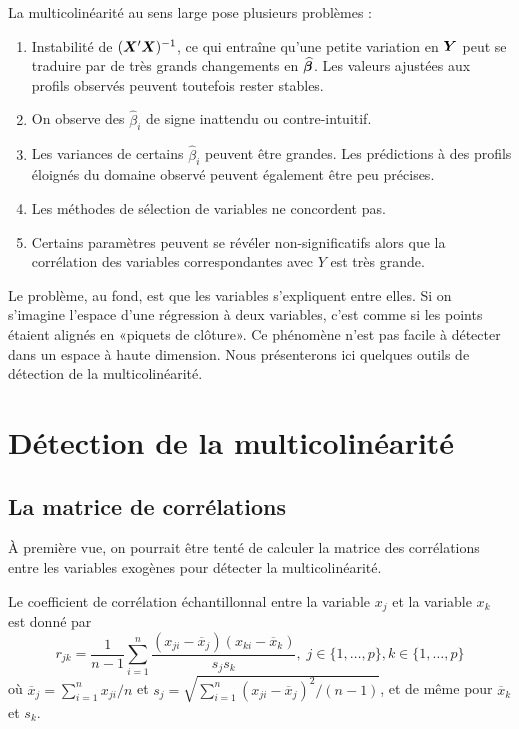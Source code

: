 La multicolinéarité au sens large pose plusieurs problèmes :
\begin{enumerate}
  \item Instabilité de $(\bm{X}'\bm{X})^{-1}$, ce qui entraîne qu'une petite variation en $\bm{Y}$ peut se traduire par de très grands changements en $\widehat{\bm\beta}$. Les valeurs ajustées aux profils observés peuvent toutefois rester stables.
  \item On observe des $\hat{\beta}_i$ de signe inattendu ou contre-intuitif.
  \item Les variances de certains $\hat{\beta}_i$ peuvent être grandes. Les prédictions à des profils éloignés du domaine observé peuvent également être peu précises.
  \item Les méthodes de sélection de variables ne concordent pas.
  \item Certains paramètres peuvent se révéler non-significatifs alors que la corrélation des variables correspondantes avec $Y$ est très grande.
\end{enumerate}

Le problème, au fond, est que les variables s'expliquent entre elles. Si on s'imagine l'espace d'une régression à deux variables, c'est comme si les points étaient alignés en «piquets de clôture». Ce phénomène n'est pas facile à détecter dans un espace à haute dimension. Nous présenterons ici quelques outils de détection de la multicolinéarité.

\section{Détection de la multicolinéarité}
\subsection{La matrice de corrélations}
À première vue, on pourrait être tenté de calculer la matrice des corrélations entre les variables exogènes pour détecter la multicolinéarité.

Le coefficient de corrélation échantillonnal entre la variable $x_j$ et la variable $x_k$ est donné par
$$r_{jk}=\dfrac{1}{n-1}\sum_{i=1}^n\frac{(x_{ji}-\overline x_j)(x_{ki}-\overline x_k)}{s_js_k}, \;j\in\{1,\ldots,p\},k\in\{1,\ldots,p\}$$
où $\overline x_j=\sum_{i=1}^n x_{ji}/n$ et $s_j=\sqrt{\sum_{i=1}^n(x_{ji}-\overline x_j)^2/(n-1)}$, et de même pour $\overline x_k$ et $s_k$.

